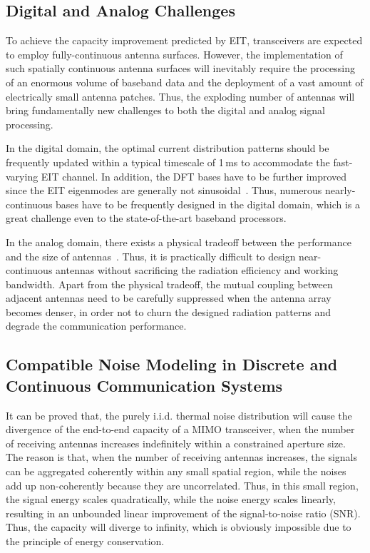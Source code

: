 \documentclass[journal,twocolumn]{IEEEtran}
\begin{document}
\subsection{Digital and Analog Challenges}
To achieve the capacity improvement predicted by EIT, transceivers are expected to employ fully-continuous antenna surfaces. However, the implementation of such spatially continuous antenna surfaces will inevitably require the processing of an enormous volume of baseband data and the deployment of a vast amount of electrically small antenna patches. Thus, the exploding number of antennas will bring fundamentally new challenges to both the digital and analog signal processing. 

In the digital domain, the optimal current distribution patterns should be frequently updated within a typical timescale of 1\,ms to accommodate the fast-varying EIT channel. In addition, the DFT bases have to be further improved since the EIT eigenmodes are generally not sinusoidal~\cite{marzetta2022fourier}. Thus, numerous nearly-continuous bases have to be frequently designed in the digital domain, which is a great challenge even to the state-of-the-art baseband processors.  

In the analog domain, there exists a physical tradeoff between the performance and the size of antennas~\cite{stratton2007electromagnetic}. Thus, it is practically difficult to design near-continuous antennas without sacrificing the radiation efficiency and working bandwidth. Apart from the physical tradeoff, the mutual coupling between adjacent antennas need to be carefully suppressed when the antenna array becomes denser, in order not to churn the designed radiation patterns and degrade the communication performance. 


\subsection{Compatible Noise Modeling in Discrete and Continuous Communication Systems}
It can be proved that, the purely i.i.d. thermal noise distribution will cause the divergence of the end-to-end capacity of a MIMO transceiver, when the number of receiving antennas increases indefinitely within a constrained aperture size. 
The reason is that, when the number of receiving antennas increases, the signals can be aggregated coherently within any small spatial region, while the noises add up non-coherently because they are uncorrelated. 
Thus, in this small region, the signal energy scales quadratically, while the noise energy scales linearly, resulting in an unbounded linear improvement of the signal-to-noise ratio (SNR). Thus, the capacity will diverge to infinity, which is obviously impossible due to the principle of energy conservation.  
\end{document}
